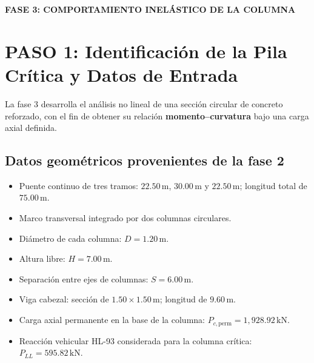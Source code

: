 \documentclass[11pt,a4paper]{article}
\begin{document}
\begin{center}
{\large\bfseries FASE 3: COMPORTAMIENTO INELÁSTICO DE LA COLUMNA}\\[3pt]

\end{center}
\vspace{2mm}

\section{PASO 1: Identificación de la Pila Crítica y Datos de Entrada}

La fase 3 desarrolla el análisis no lineal de una sección circular de concreto
reforzado, con el fin de obtener su relación \textbf{momento--curvatura} bajo
una carga axial definida. 

\subsection*{Datos geométricos provenientes de la fase 2}
\begin{itemize}
  \item Puente continuo de tres tramos: $22.50\,\mathrm{m}$, $30.00\,\mathrm{m}$ y $22.50\,\mathrm{m}$; longitud total de $75.00\,\mathrm{m}$.
  \item Marco transversal integrado por dos columnas circulares.
  \item Diámetro de cada columna: $D=1.20\,\mathrm{m}$.
  \item Altura libre: $H=7.00\,\mathrm{m}$.
  \item Separación entre ejes de columnas: $S=6.00\,\mathrm{m}$.
  \item Viga cabezal: sección de $1.50\times 1.50\,\mathrm{m}$; longitud de $9.60\,\mathrm{m}$.
  \item Carga axial permanente en la base de la columna: $P_{c,\mathrm{perm}}=1{,}928.92\,\mathrm{kN}$.
  \item Reacción vehicular HL-93 considerada para la columna crítica: $P_{LL}=595.82\,\mathrm{kN}$.
\end{itemize}
\end{document}
